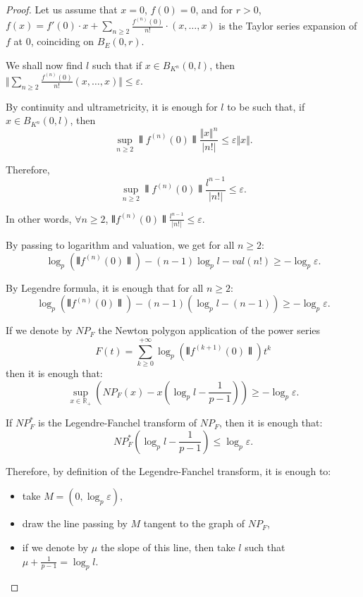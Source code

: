 \documentclass{amsart}
\begin{document}
\begin{proof}
Let us assume that $x=0$, $f(0)=0$, and for $r>0$, $f(x)=f'(0) \cdot x +\sum_{n \geq 2} \frac{f^{(n)}(0)}{n!} \cdot (x, \dots,x)$ is the Taylor series expansion of $f$ at $0$, coinciding on $B_E (0,r)$.

We shall now find $l$ such that if $x \in B_{K^n}(0,l)$, then $\Vert \sum_{n \geq 2} \frac{f^{(n)}(0)}{n!}(x,\dots,x) \Vert \leq \varepsilon$.

By continuity and ultrametricity, it is enough for $l$ to be such that, if $x \in B_{K^n}(0,l)$, then  \[ \sup_{n \geq 2} \interleave f^{(n)}(0) \interleave \frac{\Vert x \Vert^n }{ \vert n! \vert } \leq \varepsilon \Vert x \Vert .\] 

Therefore, \[ \sup_{n \geq 2} \interleave f^{(n)}(0) \interleave \frac{l^{n-1} }{\vert n! \vert } \leq \varepsilon . \] 

In other words, $\forall n \geq 2$, $\interleave f^{(n)}(0) \interleave \frac{l^{n-1} }{\vert n! \vert } \leq \varepsilon.$

By passing to logarithm and valuation, we get for all $n \geq 2$: \[ \log_p (\interleave f^{(n)}(0) \interleave )-(n-1) \log_p l-val (n!)\geq - \log_p \varepsilon.\]

By Legendre formula, it is enough that for all $n \geq 2$:
\[
\log_p (\interleave f^{(n)}(0) \interleave )-(n-1) (\log_p l-(n-1)) \geq - \log_p \varepsilon.
\]

If we denote by $NP_F$ the Newton polygon application of the power series 
\[
F(t) = \sum_{k\geq 0}^{+\infty} \log_p (\interleave f^{(k+1)}(0) \interleave ) t^k
\]
then it is enough that:
\[
\sup_{ x \in \mathbb{R}_+} \left( NP_F(x) -x  \left( \log_p l - \frac{1}{p-1} \right) \right) \geq - \log_p \varepsilon.
\]

If $NP_F^*$ is the Legendre-Fanchel transform of $NP_F$, then it is enough that:
\[ NP_F^* \left( \log_p l - \frac{1}{p-1} \right) \leq \log_p \varepsilon.\]

Therefore, by definition of the Legendre-Fanchel transform, it is enough to:
\begin{itemize}
\item take $M=(0,\log_p \varepsilon)$,
\item draw the line passing by $M$ tangent to the graph of $NP_F$,
\item if we denote by $\mu$ the slope of this line, then take $l$ such that $\mu + \frac{1}{p-1}=\log_p l$.
\end{itemize}
\end{proof}
\end{document}

